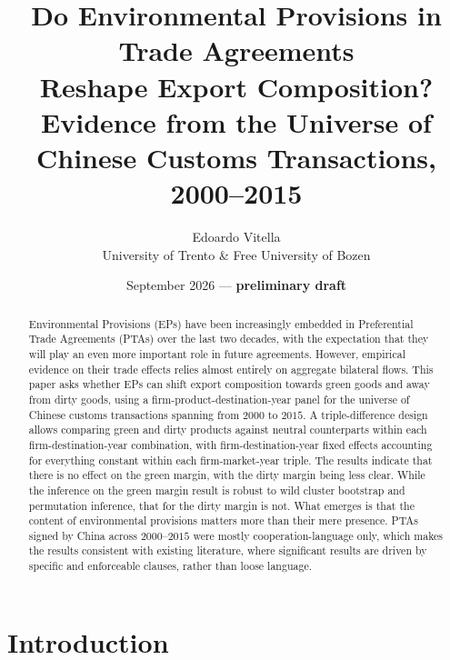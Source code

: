 \documentclass[12pt]{article}
\title{Do Environmental Provisions in Trade Agreements\\ Reshape Export Composition?\\
\large Evidence from the Universe of Chinese Customs Transactions, 2000--2015}
\author{Edoardo Vitella\\
\small University of Trento \& Free University of Bozen}
\date{September 2026 --- \textbf{preliminary draft}}
\begin{document}
\maketitle

\begin{abstract}
\noindent
Environmental Provisions (EPs) have been increasingly embedded in Preferential Trade Agreements (PTAs) over the last two decades, with the expectation that they will play an even more important role in future agreements. However, empirical evidence on their trade effects relies almost entirely on aggregate bilateral flows. This paper asks whether EPs can shift export composition towards green goods and away from dirty goods, using a firm-product-destination-year panel for the universe of Chinese customs transactions spanning from $2000$ to $2015$. A triple-difference design allows comparing green and dirty products against neutral counterparts within each firm-destination-year combination, with firm-destination-year fixed effects accounting for everything constant within each firm-market-year triple. The results indicate that there is no effect on the green margin, with the dirty margin being less clear. While the inference on the green margin result is robust to wild cluster bootstrap and permutation inference, that for the dirty margin is not. What emerges is that the content of environmental provisions matters more than their mere presence. PTAs signed by China across $2000$--$2015$ were mostly cooperation-language only, which makes the results consistent with existing literature, where significant results are driven by specific and enforceable clauses, rather than loose language.
\end{abstract}

\newpage

\section{Introduction}
\end{document}

